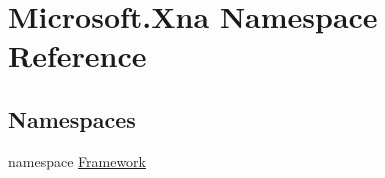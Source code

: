 \hypertarget{namespace_microsoft_1_1_xna}{}\section{Microsoft.\+Xna Namespace Reference}
\label{namespace_microsoft_1_1_xna}
\subsection*{Namespaces}
\begin{DoxyCompactItemize}
\item 
namespace \hyperlink{namespace_microsoft_1_1_xna_1_1_framework}{Framework}
\end{DoxyCompactItemize}
